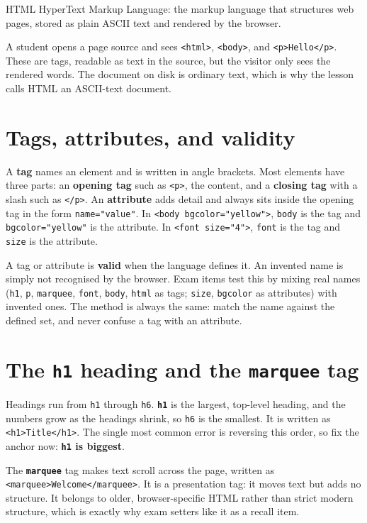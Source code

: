 \begin{definitionbox}{HTML}
HyperText Markup Language: the markup language that structures web pages, stored as plain ASCII text and rendered by the browser.
\end{definitionbox}

\begin{example}
A student opens a page source and sees \texttt{<html>}, \texttt{<body>}, and \texttt{<p>Hello</p>}. These are tags, readable as text in the source, but the visitor only sees the rendered words. The document on disk is ordinary text, which is why the lesson calls HTML an ASCII-text document.
\end{example}

\section{Tags, attributes, and validity}
A \textbf{tag} names an element and is written in angle brackets. Most elements have three parts: an \textbf{opening tag} such as \texttt{<p>}, the content, and a \textbf{closing tag} with a slash such as \texttt{</p>}. An \textbf{attribute} adds detail and always sits inside the opening tag in the form \texttt{name="value"}. In \texttt{<body bgcolor="yellow">}, \texttt{body} is the tag and \texttt{bgcolor="yellow"} is the attribute. In \texttt{<font size="4">}, \texttt{font} is the tag and \texttt{size} is the attribute.

A tag or attribute is \textbf{valid} when the language defines it. An invented name is simply not recognised by the browser. Exam items test this by mixing real names (\texttt{h1}, \texttt{p}, \texttt{marquee}, \texttt{font}, \texttt{body}, \texttt{html} as tags; \texttt{size}, \texttt{bgcolor} as attributes) with invented ones. The method is always the same: match the name against the defined set, and never confuse a tag with an attribute.

\section{The \texttt{h1} heading and the \texttt{marquee} tag}
Headings run from \texttt{h1} through \texttt{h6}. \textbf{\texttt{h1}} is the largest, top-level heading, and the numbers grow as the headings shrink, so \texttt{h6} is the smallest. It is written as \texttt{<h1>Title</h1>}. The single most common error is reversing this order, so fix the anchor now: \textbf{\texttt{h1} is biggest}.

The \textbf{\texttt{marquee}} tag makes text scroll across the page, written as \texttt{<marquee>Welcome</marquee>}. It is a presentation tag: it moves text but adds no structure. It belongs to older, browser-specific HTML rather than strict modern structure, which is exactly why exam setters like it as a recall item.


